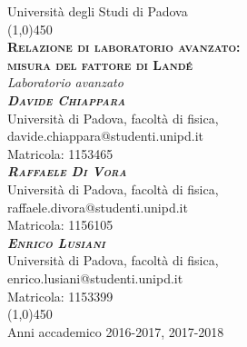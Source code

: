 
\begin{titlepage}

\begin{center}
\LARGE{Università degli Studi di Padova}\\
\line(1,0){450}\\
\vspace{1em}
\Huge{\textsc{\textbf{Relazione di laboratorio avanzato:\\ misura del fattore di Land\'e}}}\\
\vspace{2em}
\LARGE{\textit{Laboratorio avanzato}}\\
\vspace{4em}
\huge{\textbf\textsc\textit{{{Davide Chiappara}}}}\\
\vspace{0.5em}
\normalsize{Università di Padova, facoltà di fisica,}\\
\normalsize{davide.chiappara@studenti.unipd.it}\\
\normalsize{Matricola: 1153465}\\
\vspace{1em}
\huge{\textbf\textsc\textit{{{Raffaele Di Vora}}}}\\
\vspace{0.5em}
\normalsize{Università di Padova, facoltà di fisica,}\\
\normalsize{raffaele.divora@studenti.unipd.it}\\
\normalsize{Matricola: 1156105}\\
\vspace{1em}
\huge{\textbf\textsc\textit{{{Enrico Lusiani}}}}\\
\vspace{0.5em}
\normalsize{Università di Padova, facoltà di fisica,}\\
\normalsize{enrico.lusiani@studenti.unipd.it}\\
\normalsize{Matricola: 1153399}\\
\vfill
\line(1,0){450}\\
\LARGE{Anni accademico 2016-2017, 2017-2018}
\end{center}

\end{titlepage}

